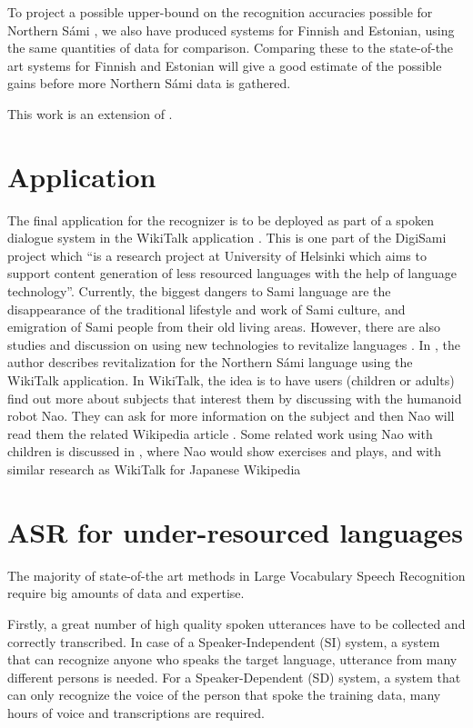 \documentclass[b5paper]{article}
\newcommand{\ns}{{Northern Sámi }}
\begin{document}
To project a possible upper-bound on the recognition accuracies possible for \ns, we also have produced systems for Finnish and Estonian, using the same quantities of data for comparison. Comparing these to the state-of-the art systems for Finnish and Estonian will give a good estimate of the possible gains before more \ns data is gathered.

This work is an extension of \cite{leinonen2015}.

\section{Application}
The final application for the recognizer is to be deployed as part of a spoken dialogue system in the WikiTalk application \cite{wilcock2013wikitalk}. This is one part of the DigiSami project which ``is a research project at University of Helsinki which aims to support content generation of less resourced languages with the help of language technology''. Currently, the biggest dangers to Sami language are the disappearance of the traditional lifestyle and work of Sami culture, and emigration of Sami people from their old living areas. However, there are also studies and discussion on using new technologies to revitalize languages \cite{eisenlohr2004language}. In \cite{jokinen2014open}, the author describes revitalization for the \ns language using the WikiTalk application. In WikiTalk, the idea is to have users (children or adults) find out more about subjects that interest them by discussing with the humanoid robot Nao. They can ask for more information on the subject and then Nao will read them the related Wikipedia article \cite{jokinen2014multimodal}. Some related work using Nao with children is discussed in \cite{kruijff2012spoken}, where Nao would show exercises and plays, and with similar research as WikiTalk for Japanese Wikipedia \cite{kobayashi2011intelligent}




\section{ASR for under-resourced languages}
The majority of state-of-the art methods in Large Vocabulary Speech Recognition require big amounts of data and expertise. 

Firstly, a great number of high quality spoken utterances have to be collected and correctly transcribed. In case of a Speaker-Independent (SI) system, a system that can recognize anyone who speaks the target language, utterance from many different persons is needed. For a Speaker-Dependent (SD) system, a system that can only recognize the voice of the person that spoke the training data, many hours of voice and transcriptions are required.
\end{document}
